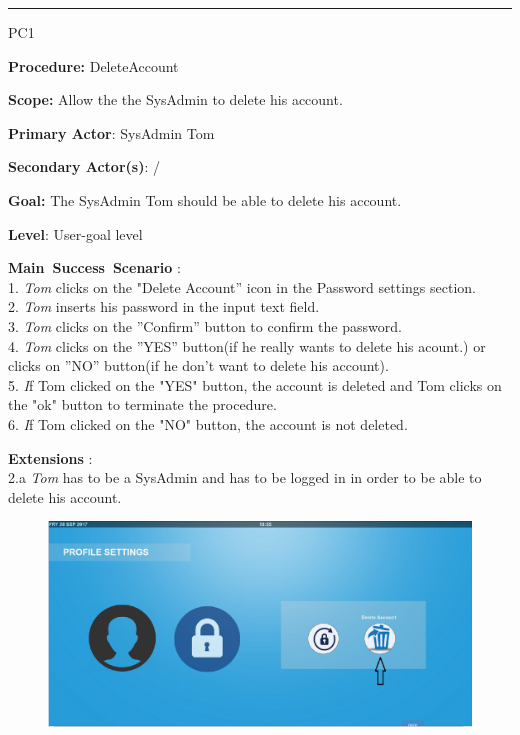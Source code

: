 \hrule
\vspace{0.5cm}
\begin{lyxlist}{PC1}
\small{
\item [\textbf{Procedure:}] DeleteAccount 
\item [\textbf{Scope:}] Allow the the SysAdmin to delete his account.
\item [\textbf{Primary Actor}:] SysAdmin Tom
\item [\textbf{Secondary Actor(s)}:] /
\item [\textbf{Goal:}] The SysAdmin Tom should be able to delete his account.
\item [\textbf{Level}:] User-goal level
\item [\textbf{Main~Success~Scenario}]:\\
1. \emph{Tom} clicks on the "Delete Account'' icon in the Password settings
section.\\
2. \emph{Tom} inserts his password in the input text field.\\
3. \emph{Tom} clicks on the ''Confirm'' button to confirm the password.\\
4. \emph{Tom} clicks on the ''YES'' button(if he really wants to delete his
acount.) or clicks on ''NO'' button(if he don't want to delete his account).\\
5. \emph If {Tom} clicked on the "YES" button, the account is deleted and
{Tom} clicks on the "ok" button to terminate the procedure.\\
6. \emph If {Tom} clicked on the "NO" button, the account is not deleted.\\

\item [\textbf{Extensions}]:\\
2.a \emph{Tom} has to be a SysAdmin and has to be logged in in order to be able
to delete his account.\\
}


\begin{figure}[H]
\centering
\includegraphics[width=170mm]{images/deletAcc1.eps}
\caption{\label{overflow}}
\end{figure}



\end{lyxlist}
